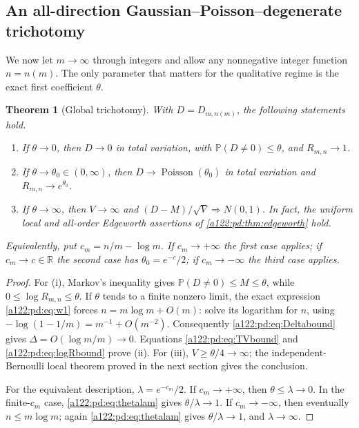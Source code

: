 \documentclass[11pt,letterpaper]{article}
\numberwithin{equation}{subsection}
\newtheorem{theorem}{Theorem}[subsection]
\theoremstyle{definition}
\theoremstyle{remark}
\theoremstyle{plain}
\newcommand{\Prob}{\mathbb P}
\newcommand{\Poi}{\operatorname{Poisson}}
\newcommand{\R}{\mathbb R}
\begin{document}
\subsection{An all-direction Gaussian--Poisson--degenerate trichotomy}
\label{a122:pd:sec:phase}
We now let $m\to\infty$ through integers and allow any nonnegative
integer function $n=n(m)$. The only parameter that matters for the
qualitative regime is the exact first coefficient $\theta$.

\begin{theorem}[Global trichotomy]\label{a122:pd:thm:trichotomy}
With $D=D_{m,n(m)}$, the following statements hold.
\begin{enumerate}[label=\textup{(\roman*)},itemsep=3pt]
\item If $\theta\to0$, then $D\to0$ in total variation, with
$\Prob(D\ne0)\le\theta$, and $R_{m,n}\to1$.
\item If $\theta\to\theta_0\in(0,\infty)$, then
$D\to\Poi(\theta_0)$ in total variation and
$R_{m,n}\to e^{\theta_0}$.
\item If $\theta\to\infty$, then $V\to\infty$ and
$(D-M)/\sqrt V\Longrightarrow N(0,1)$. In fact, the uniform local
and all-order Edgeworth assertions of \cref{a122:pd:thm:edgeworth} hold.
\end{enumerate}
Equivalently, put $c_m=n/m-\log m$. If $c_m\to+\infty$ the first
case applies; if $c_m\to c\in\R$ the second case has
$\theta_0=e^{-c}/2$; if $c_m\to-\infty$ the third case applies.
\end{theorem}
\begin{proof}
For (i), Markov's inequality gives
$\Prob(D\ne0)\le M\le\theta$, while
$0\le\log R_{m,n}\le\theta$.
If $\theta$ tends to a finite nonzero limit, the exact expression
\eqref{a122:pd:eq:w1} forces
$n=m\log m+O(m)$: solve its logarithm for $n$, using
$-\log(1-1/m)=m^{-1}+O(m^{-2})$.
Consequently \eqref{a122:pd:eq:Deltabound} gives
$\Delta=O(\log m/m)\to0$. Equations
\eqref{a122:pd:eq:TVbound} and \eqref{a122:pd:eq:logRbound} prove (ii).
For (iii), $V\ge\theta/4\to\infty$; the independent-Bernoulli
local theorem proved in the next section gives the conclusion.

For the equivalent description, $\lambda=e^{-c_m}/2$.
If $c_m\to+\infty$, then $\theta\le\lambda\to0$.
In the finite-$c_m$ case, \eqref{a122:pd:eq:thetalam} gives
$\theta/\lambda\to1$.
If $c_m\to-\infty$, then eventually $n\le m\log m$;
again \eqref{a122:pd:eq:thetalam} gives $\theta/\lambda\to1$, and
$\lambda\to\infty$.
\end{proof}
\end{document}

